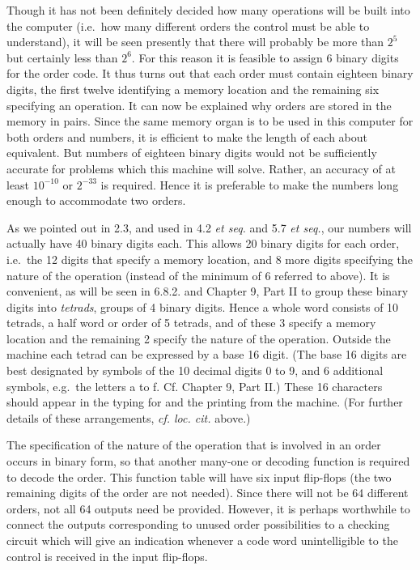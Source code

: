 \documentclass[12pt]{amsart}
\begin{document}
Though it has not been definitely decided how many operations will be built into the computer (i.e.\ how many different orders the control must be able to understand), it will be seen presently that there will probably be more than $2^5$ but certainly less than $2^6$. For this reason it is feasible to assign 6 binary digits for the order code. It thus turns out that each order must contain eighteen binary digits, the first twelve identifying a memory location and the remaining six specifying an operation. It can now be explained why orders are stored in the memory in pairs. Since the same memory organ is to be used in this computer for both orders and numbers, it is efficient to make the length of each about equivalent. But numbers of eighteen binary digits would not be sufficiently accurate for problems which this machine will solve. Rather, an accuracy of at least $10^{-10}$ or $2^{-33}$ is required. Hence it is preferable to make the numbers long enough to accommodate two orders.

As we pointed out in 2.3, and used in 4.2 \emph{et seq.} and 5.7 \emph{et seq.}, our numbers will actually have 40 binary digits each. This allows 20 binary digits for each order, i.e.\ the 12 digits that specify a memory location, and 8 more digits specifying the nature of the operation (instead of the minimum of 6 referred to above). It is convenient, as will be seen in 6.8.2. and Chapter 9, Part II to group these binary digits into \emph{tetrads}, groups of 4 binary digits. Hence a whole word consists of 10 tetrads, a half word or order of 5 tetrads, and of these 3 specify a memory location and the remaining 2 specify the nature of the operation. Outside the machine each tetrad can be expressed by a base 16 digit. (The base 16 digits are best designated by symbols of the 10 decimal digits 0 to 9, and 6 additional symbols, e.g.\ the letters a to f. Cf. Chapter 9, Part II.) These 16 characters should appear in the typing for and the printing from the machine. (For further details of these arrangements, \emph{cf. loc. cit.} above.)

The specification of the nature of the operation that is involved in an order occurs in binary form, so that another many-one or decoding function is required to decode the order. This function table will have six input flip-flops (the two remaining digits of the order are not needed). Since there will not be 64 different orders, not all 64 outputs need be provided. However, it is perhaps worthwhile to connect the outputs corresponding to unused order possibilities to a checking circuit which will give an indication whenever a code word unintelligible to the control is received in the input flip-flops.
\end{document}
